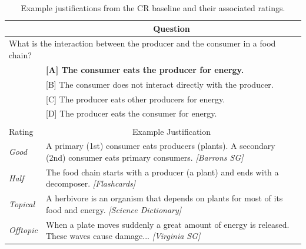 {%
%
\begin{table}[t]
\caption{{ \label{font-table} Example justifications from the CR baseline and their associated ratings. }} %
\begin{center}
\begin{footnotesize}
\begin{tabularx}{\textwidth}{p{1cm}p{11.5cm}}
\hline
\multicolumn{1}{c}{} & \multicolumn{1}{c}{Question} \\
\hline			
\multicolumn{2}{l}{	What is the interaction between the producer and the consumer in a food chain?} \\
		&	\textbf{[A] The consumer eats the producer for energy.}  \\
		&  [B] The consumer does not interact directly with the producer. \\
			&   [C] The producer eats other producers for energy.   \\
			& [D] The producer eats the consumer for energy. \\

\multicolumn{1}{c}{} & \multicolumn{1}{c}{} \\				
\hline
\multicolumn{1}{l}{Rating} & \multicolumn{1}{c}{Example Justification} \\
\hline			
{\em Good }		&	A primary (1st) consumer eats producers (plants). A secondary (2nd) consumer eats primary consumers. {\em [Barrons SG]}  	\\
{\em Half }		&	The food chain starts with a producer (a plant) and ends with a decomposer. {\em [Flashcards]} \\
{\em Topical }	&   A herbivore is an organism that depends on plants for most of its food and energy. {\em [Science Dictionary]} \\
{\em Offtopic }	&	When a plate moves suddenly a great amount of energy is released.  These waves cause damage...  {\em [Virginia SG]} \\
\end{tabularx}
\end{footnotesize}
\label{tab:justificationsIRexamples}


\end{center}
\end{table}}
